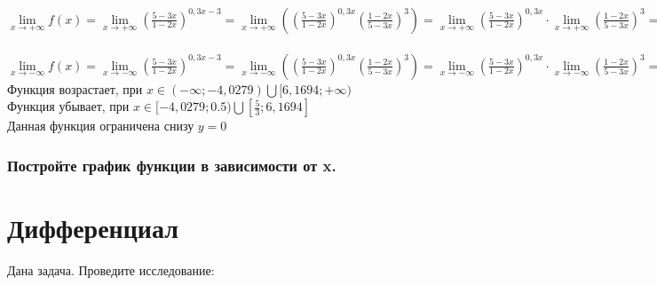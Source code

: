 \documentclass[a4paper,12pt]{article}
\begin{document}
$\lim\limits_{x\rightarrow+\infty}f(x)=
\lim\limits_{x\rightarrow+\infty}
	\left(\frac{5-3x}{1-2x}\right)^{0,3x-3}=
\lim\limits_{x\rightarrow+\infty}\left(
	\left(\frac{5-3x}{1-2x}\right)^{0,3x}\left(
	\frac{1-2x}{5-3x}\right)^3\right)=
\lim\limits_{x\rightarrow+\infty}
	\left(\frac{5-3x}{1-2x}\right)^{0,3x}\cdot
	\lim\limits_{x\rightarrow+\infty}
	\left(\frac{1-2x}{5-3x}\right)^3=
+\infty\cdot\lim\limits_{x\rightarrow+\infty}
	\left(\frac{\frac1x-2}{\frac5x-3}\right)^3=
+\infty\cdot\frac8{27}=+\infty$\\\\
$\lim\limits_{x\rightarrow-\infty}f(x)=
\lim\limits_{x\rightarrow-\infty}
	\left(\frac{5-3x}{1-2x}\right)^{0,3x-3}=
\lim\limits_{x\rightarrow-\infty}\left(
	\left(\frac{5-3x}{1-2x}\right)^{0,3x}\left(
	\frac{1-2x}{5-3x}\right)^3\right)=
\lim\limits_{x\rightarrow-\infty}
	\left(\frac{5-3x}{1-2x}\right)^{0,3x}\cdot
	\lim\limits_{x\rightarrow-\infty}
	\left(\frac{1-2x}{5-3x}\right)^3=
0\cdot\lim\limits_{x\rightarrow-\infty}
	\left(\frac{\frac1x-2}{\frac5x-3}\right)^3=
0\cdot\frac8{27}=0$\\
Функция возрастает, при $x\in(-\infty;-4,0279)\bigcup[6,1694;+\infty)$\\
Функция убывает, при $x\in[-4,0279;0.5)\bigcup[\frac{5}{3};6,1694]$\\
Данная функция ограничена снизу $y=0$

\subsubsection{Постройте график функции в зависимости от x.}


\newpage
\section{Дифференциал}
Дана задача. Проведите исследование:
\end{document}
